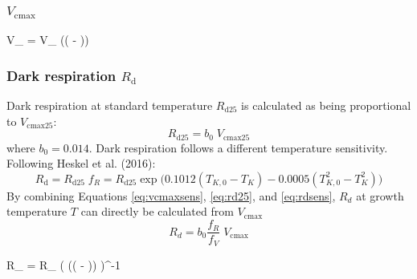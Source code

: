 \documentclass{myreport}
\begin{document}
\subsubsection{$V_{\mathrm{cmax}}$}

   V_{} = V_{} \; \exp\Bigg(\Big(  -  \Big)\Bigg)



\subsubsection{Dark respiration $R_{\mathrm{d}}$}

Dark respiration at standard temperature $R_{\mathrm{d25}}$ is calculated as being proportional to $V_{\mathrm{cmax25}}$:
\begin{equation}
\label{eq:rd25}
    R_{\mathrm{d25}} = b_0 \; V_{\mathrm{cmax25}}
\end{equation}
where $b_0 = 0.014$. 
Dark respiration follows a different temperature sensitivity. Following Heskel et al. (2016):
\begin{equation}
\label{eq:rdsens}
    R_{\mathrm{d}} =  R_{\mathrm{d25}}\; f_R  = R_{\mathrm{d25}} \exp \Big(  0.1012(T_{K,0}-T_K) - 0.0005(T_{K,0}^2-T_K^2) \Big) 
\end{equation}
By combining Equations \ref{eq:vcmaxsens}, \ref{eq:rd25}, and \ref{eq:rdsens}, $R_d$ at growth temperature $T$ can directly be calculated from $V_{\mathrm{cmax}}$
\begin{equation}
    R_d = b_0 \frac{f_R}{f_V}\;V_{\mathrm{cmax}}
\end{equation}

   R_{} = R_{} \Bigg( \exp\Bigg(\Big(  -  \Big)\Bigg) \Bigg)^{-1}
\end{document}
